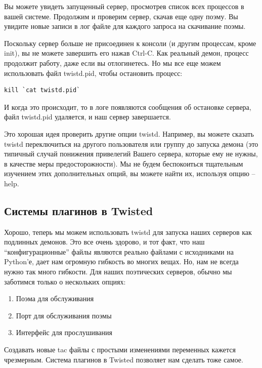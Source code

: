 Вы можете увидеть запущенный сервер, просмотрев список 
всех процессов в вашей системе. Продолжим и проверим 
сервер, скачав еще одну поэму. Вы увидите новые записи 
в лог файле для каждого запроса на скачивание поэмы.


Поскольку сервер больше не присоединен к консоли (и 
другим процессам, кроме init), вы не можете завершить его 
нажав Ctrl-C. Как реальный демон, процесс продолжит работу, 
даже если вы отлогинетесь. Но мы все еще можем использовать 
файл twistd.pid, чтобы остановить процесс:

\begin{scriptsize}\begin{verbatim}
kill `cat twistd.pid`
\end{verbatim}\end{scriptsize}


И когда это происходит, то в логе появляются 
сообщения об остановке сервера, файл twistd.pid 
удаляется, и наш сервер завершается.


Это хорошая идея проверить другие опции twistd. 
Например, вы можете сказать twistd переключиться на 
другого пользователя или группу до запуска демона (это 
типичный случай понижения привелегий Вашего сервера, 
которые ему не нужны, в качестве меры предосторожности). 
Мы не будем беспокоиться тщательным изучением этих 
дополнительных опций, вы можете найти их, используя 
опцию --help. 


\subsection{Системы плагинов в Twisted}

Хорошо, теперь мы можем использовать twistd для запуска 
наших серверов как подлинных демонов. Это все очень 
здорово, и тот факт, что наш ``конфигурационные'' файлы 
являются реально файлами с исходниками на Python'е, дает 
нам огромную гибкость во многих вещах. Но, нам не всегда 
нужно так много гибкости. Для наших поэтических серверов, 
обычно мы заботимся только о нескольких опциях:

\begin{enumerate}
\item Поэма для обслуживания
\item Порт для обслуживания поэмы
\item Интерфейс для прослушивания
\end{enumerate}


Создавать новые tac файлы с простыми изменениями 
переменных кажется чрезмерным. Система плагинов в 
Twisted позволяет нам сделать тоже самое.


